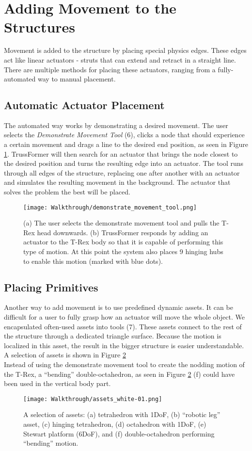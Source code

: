 \section{Adding Movement to the Structures}
Movement is added to the structure by placing special physics edges. These edges act like linear actuators - struts that can extend and retract in a straight line. There are multiple methods for placing these actuators, ranging from a fully-automated way to manual placement.

\subsection{Automatic Actuator Placement}
The automated way works by demonstrating a desired movement. The user selects the \textit{Demonstrate Movement Tool} (6), clicks a node that should experience a certain movement and drags a line to the desired end position, as seen in Figure \ref{fig:demonstrate_movement}. TrussFormer will then search for an actuator that brings the node closest to the desired position and turns the resulting edge into an actuator. The tool runs through all edges of the structure, replacing one after another with an actuator and simulates the resulting movement in the background. The actuator that solves the problem the best will be placed.
\begin{figure}[ht!]
    \texttt{[image: Walkthrough/demonstrate\_movement\_tool.png]}
    \centering
    \caption{(a) The user selects the demonstrate movement tool and pulls the T-Rex head downwards. (b) TrussFormer responds by adding an actuator to the T-Rex body so that it is capable of performing this type of motion. At this point the system also places 9 hinging hubs to enable this motion (marked with blue dots).}
    \label{fig:demonstrate_movement}
\end{figure}

\subsection{Placing Primitives}
Another way to add movement is to use predefined dynamic assets. It can be difficult for a user to fully grasp how an actuator will move the whole object. We encapsulated often-used assets into tools (7). These assets connect to the rest of the structure through a dedicated triangle surface. Because the motion is localized in this asset, the result in the bigger structure is easier understandable. A selection of assets is shown in Figure \ref{fig:dynamic_assets}\\
Instead of using the demonstrate movement tool to create the nodding motion of the T-Rex, a ``bending'' double-octahedron, as seen in Figure \ref{fig:dynamic_assets} (f) could have been used in the vertical body part.
\begin{figure}[ht!]
    \texttt{[image: Walkthrough/assets\_white-01.png]}
    \centering
    \caption{A selection of assets: (a) tetrahedron with 1DoF, (b) “robotic leg” asset, (c) hinging tetrahedron, (d) octahedron with 1DoF, (e) Stewart platform (6DoF), and (f) double-octahedron performing “bending” motion.}
    \label{fig:dynamic_assets}
\end{figure}

